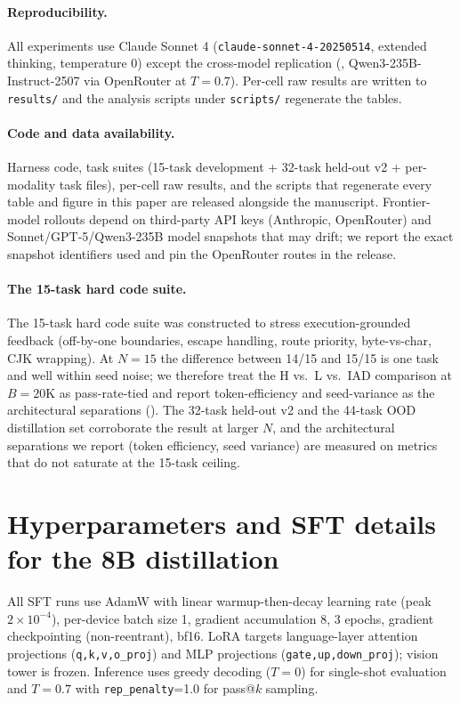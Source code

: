 \documentclass[11pt]{article}
\begin{document}
\paragraph{Reproducibility.} All experiments use Claude Sonnet 4 (\texttt{claude-sonnet-4-20250514}, extended thinking, temperature 0) except the cross-model replication (, Qwen3-235B-Instruct-2507 via OpenRouter at $T{=}0.7$). Per-cell raw results are written to \texttt{results/} and the analysis scripts under \texttt{scripts/} regenerate the tables.

\paragraph{Code and data availability.} Harness code, task suites (15-task development + 32-task held-out v2 + per-modality task files), per-cell raw results, and the scripts that regenerate every table and figure in this paper are released alongside the manuscript. Frontier-model rollouts depend on third-party API keys (Anthropic, OpenRouter) and Sonnet/GPT-5/Qwen3-235B model snapshots that may drift; we report the exact snapshot identifiers used and pin the OpenRouter routes in the release.

\paragraph{The 15-task hard code suite.} The 15-task hard code suite was constructed to stress execution-grounded feedback (off-by-one boundaries, escape handling, route priority, byte-vs-char, CJK wrapping). At $N{=}15$ the difference between 14/15 and 15/15 is one task and well within seed noise; we therefore treat the H vs.\ L vs.\ IAD comparison at $B{=}20$K as pass-rate-tied and report token-efficiency and seed-variance as the architectural separations (). The 32-task held-out v2 and the 44-task OOD distillation set corroborate the result at larger $N$, and the architectural separations we report (token efficiency, seed variance) are measured on metrics that do not saturate at the 15-task ceiling.

\section{Hyperparameters and SFT details for the 8B distillation}
\label{app:hyperparams}

All SFT runs use AdamW with linear warmup-then-decay learning rate (peak $2{\times}10^{-4}$), per-device batch size 1, gradient accumulation 8, 3 epochs, gradient checkpointing (non-reentrant), bf16. LoRA targets language-layer attention projections (\texttt{q,k,v,o\_proj}) and MLP projections (\texttt{gate,up,down\_proj}); vision tower is frozen. Inference uses greedy decoding ($T{=}0$) for single-shot evaluation and $T{=}0.7$ with \texttt{rep\_penalty}=1.0 for pass@$k$ sampling.
\end{document}
